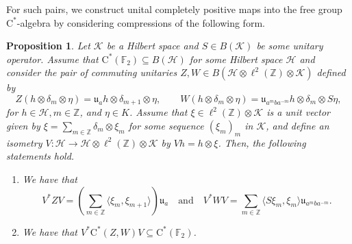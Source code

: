 \documentclass[10pt]{amsart}
\newcommand{\bF}{{\mathbb{F}}}
\newcommand{\bZ}{{\mathbb{Z}}}
\renewcommand{\H}{{\mathcal{H}}}
\newcommand{\K}{{\mathcal{K}}}
\newcommand{\rC}{\mathrm{C}}
\newtheorem{proposition}[theorem]{Proposition}
\begin{document}
For such pairs, we construct unital completely positive maps into the free group $\rC^*$-algebra by considering compressions of the following form.

\begin{proposition}\label{p:univ-uni-compress}
    Let $\K$ be a Hilbert space and $S\in B(\K)$ be some unitary operator. Assume that $\rC^*(\bF_2)\subseteq B(\H)$ for some Hilbert space $\H$ and consider the pair of commuting unitaries $Z,W\in B(\H\otimes \ell^2(\bZ)\otimes\K)$ defined by
    \[
        Z(h\otimes\delta_m\otimes\eta) = \mathfrak{u}_ah\otimes\delta_{m+1}\otimes\eta, \qquad W(h\otimes\delta_m\otimes\eta) = \mathfrak{u}_{a^m ba^{-m}}h\otimes\delta_m\otimes S\eta,
    \]
    for $h\in\H, m\in\bZ$, and $\eta\in K$. Assume that $\xi\in\ell^2(\bZ)\otimes\K$ is a unit vector given by $\xi=\sum_{m\in\bZ}\delta_m\otimes\xi_m$ for some sequence $(\xi_m)_m$ in $\K$, and define an isometry $V:\H\rightarrow \H\otimes \ell^2(\bZ)\otimes\K$ by $Vh=h\otimes\xi$. Then, the following statements hold.
    \begin{enumerate}[{\rm (i)}]
        \item We have that
        \[
            V^*ZV = \left(\sum_{m\in\bZ}\langle \xi_m,\xi_{m+1}\rangle \right)\mathfrak{u}_a \quad \text{and} \quad V^*WV = \sum_{m\in\bZ} \langle S\xi_m,\xi_m\rangle\mathfrak{u}_{a^m b a^{-m}}.
        \]
        \item We have that $V^* \rC^*(Z,W) V \subseteq \rC^*(\bF_2)$.
    \end{enumerate}
\end{proposition}
\end{document}
